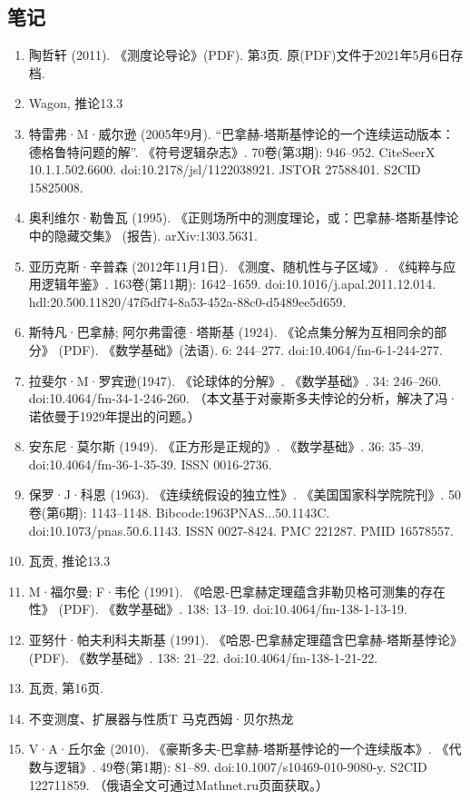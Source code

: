 \subsection{笔记}  
\begin{enumerate}
\item 陶哲轩 (2011). 《测度论导论》(PDF). 第3页. 原(PDF)文件于2021年5月6日存档.  
\item Wagon, 推论13.3  
\item 特雷弗·M·威尔逊 (2005年9月). “巴拿赫-塔斯基悖论的一个连续运动版本：德格鲁特问题的解”. 《符号逻辑杂志》. 70卷(第3期): 946–952. CiteSeerX 10.1.1.502.6600. doi:10.2178/jsl/1122038921. JSTOR 27588401. S2CID 15825008.  
\item 奥利维尔·勒鲁瓦 (1995). 《正则场所中的测度理论，或：巴拿赫-塔斯基悖论中的隐藏交集》 (报告). arXiv:1303.5631.  
\item 亚历克斯·辛普森 (2012年11月1日). 《测度、随机性与子区域》. 《纯粹与应用逻辑年鉴》. 163卷(第11期): 1642–1659. doi:10.1016/j.apal.2011.12.014. hdl:20.500.11820/47f5df74-8a53-452a-88c0-d5489ee5d659.  
\item 斯特凡·巴拿赫; 阿尔弗雷德·塔斯基 (1924). 《论点集分解为互相同余的部分》 (PDF). 《数学基础》(法语). 6: 244–277. doi:10.4064/fm-6-1-244-277.  
\item 拉斐尔·M·罗宾逊(1947). 《论球体的分解》. 《数学基础》. 34: 246–260. doi:10.4064/fm-34-1-246-260. （本文基于对豪斯多夫悖论的分析，解决了冯·诺依曼于1929年提出的问题。）  
\item 安东尼·莫尔斯 (1949). 《正方形是正规的》. 《数学基础》. 36: 35–39. doi:10.4064/fm-36-1-35-39. ISSN 0016-2736.  
\item 保罗·J·科恩 (1963). 《连续统假设的独立性》. 《美国国家科学院院刊》. 50卷(第6期): 1143–1148. Bibcode:1963PNAS...50.1143C. doi:10.1073/pnas.50.6.1143. ISSN 0027-8424. PMC 221287. PMID 16578557.  
\item 瓦贡, 推论13.3  
\item M·福尔曼; F·韦伦 (1991). 《哈恩-巴拿赫定理蕴含非勒贝格可测集的存在性》 (PDF). 《数学基础》. 138: 13–19. doi:10.4064/fm-138-1-13-19.  
\item 亚努什·帕夫利科夫斯基 (1991). 《哈恩-巴拿赫定理蕴含巴拿赫-塔斯基悖论》 (PDF). 《数学基础》. 138: 21–22. doi:10.4064/fm-138-1-21-22.  
\item 瓦贡, 第16页.  
\item 不变测度、扩展器与性质T 马克西姆·贝尔热龙  
\item V·A·丘尔金 (2010). 《豪斯多夫-巴拿赫-塔斯基悖论的一个连续版本》. 《代数与逻辑》. 49卷(第1期): 81–89. doi:10.1007/s10469-010-9080-y. S2CID 122711859. （俄语全文可通过Mathnet.ru页面获取。） 

\end{enumerate}
